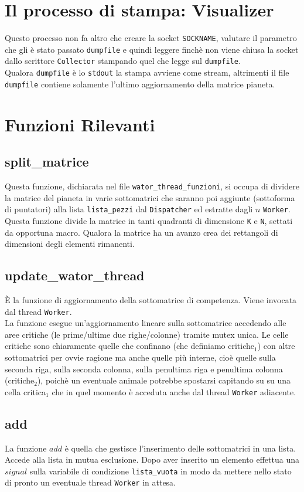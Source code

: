 \documentclass[]{article}
\begin{document}
\section{Il processo di stampa: Visualizer}
Questo processo non fa altro che creare la socket \texttt{SOCKNAME}, valutare il parametro che gli è stato passato \texttt{dumpfile} e quindi leggere finchè non viene chiusa la socket dallo scrittore \texttt{Collector} stampando quel che legge sul \texttt{dumpfile}.\\
Qualora \texttt{dumpfile} è lo \texttt{stdout} la stampa avviene come stream, altrimenti il file \texttt{dumpfile} contiene solamente l'ultimo aggiornamento della matrice pianeta.

\section{Funzioni Rilevanti}
\subsection{split\_matrice}
Questa funzione, dichiarata nel file \texttt{wator\_thread\_funzioni}, si occupa di dividere la matrice del pianeta in varie sottomatrici che saranno poi aggiunte (sottoforma di puntatori) alla lista \texttt{lista\_pezzi} dal \texttt{Dispatcher} ed estratte dagli $n$ \texttt{Worker}.
Questa funzione divide la matrice in tanti quadranti di dimensione \texttt{K} e \texttt{N}, settati da opportuna macro. Qualora la matrice ha un avanzo crea dei rettangoli di dimensioni degli elementi rimanenti.

\subsection{update\_wator\_thread}
È la funzione di aggiornamento della sottomatrice di competenza. Viene invocata dal thread \texttt{Worker}.\\
La funzione esegue un'aggiornamento lineare sulla sottomatrice accedendo alle aree critiche (le prime/ultime due righe/colonne) tramite mutex unica.
Le celle critiche sono chiaramente quelle che confinano (che definiamo critiche$_1$) con altre sottomatrici per ovvie ragione ma anche quelle più interne, cioè quelle sulla seconda riga, sulla seconda colonna, sulla penultima riga e penultima colonna (critiche$_2$), poichè un eventuale animale potrebbe spostarsi capitando su su una cella critica$_1$ che in quel momento è acceduta anche dal thread \texttt{Worker} adiacente.
\subsection{add}
La funzione $add$ è quella che gestisce l'inserimento delle sottomatrici in una lista. Accede alla lista in mutua esclusione. Dopo aver inserito un elemento effettua una $signal$ sulla variabile di condizione \texttt{lista\_vuota} in modo da mettere nello stato di pronto un eventuale thread \texttt{Worker} in attesa.
\end{document}
